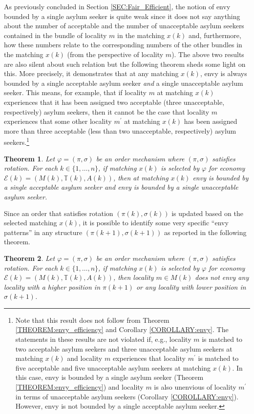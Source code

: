 \documentclass[12pt,fleqn]{article}
\newtheorem{theorem}{Theorem}
\begin{document}
\noindent As previously concluded in Section \ref{SEC:Fair_Efficient}, the notion of envy bounded by a single asylum seeker is quite weak since it does not say anything about the number of acceptable and the number of unacceptable asylum seekers contained in the bundle of locality $m$ in the matching $x(k)$ and, furthermore, how these numbers relate to the corresponding numbers of the other bundles in the matching $x(k)$ (from the perspective of locality $m$). The above two results are also silent about such relation but the following theorem sheds some light on this. More precisely, it demonstrates that at any matching $x(k)$, envy is always bounded by a single acceptable asylum seeker \emph{and} a single unacceptable asylum seeker. This means, for example, that if locality $m$ at matching $x(k)$ experiences that it has been assigned two acceptable (three unacceptable, respectively) asylum seekers, then it cannot be the case that locality $m$ experiences that some other locality $m^\prime$ at matching $x(k)$ has been assigned more than three acceptable (less than two unacceptable, respectively) asylum seekers.\footnote{Note that this result does not follow from Theorem \ref{THEOREM:envy_efficiency} and Corollary \ref{COROLLARY:envy}. The statements in these results are not violated if, e.g., locality $m$ is matched to two acceptable asylum seekers and three unacceptable asylum seekers at matching $x(k)$ and locality $m$ experiences that locality $m^\prime$ is matched to five acceptable and five unacceptable asylum seekers at matching $x(k)$. In this case, envy is bounded by a single asylum seeker (Theorem \ref{THEOREM:envy_efficiency}) and locality $m$ is also unenvious of locality $m^\prime$ in terms of unacceptable asylum seekers (Corollary \ref{COROLLARY:envy}). However, envy is not bounded by a single acceptable asylum seeker.}
\begin{theorem}\rm\label{TH:1_envy}
Let $\varphi=(\pi,\sigma)$ be an order mechanism where $(\pi,\sigma)$ satisfies rotation.
For each $k\in \{1,\ldots,n\}$, if matching $x(k)$ is selected by $\varphi$ for economy $\mathcal{E}(k)=(M(k),\mathbb{T}(k),A(k))$, then at matching $x(k)$ envy is bounded by a single acceptable asylum seeker \textit{and} envy is bounded by a single unacceptable asylum seeker.
\end{theorem}
\noindent Since an order that satisfies rotation $(\pi(k),\sigma(k))$ is updated based on the selected matching $x(k)$, it is possible to identify some very specific ``envy patterns'' in any structure $(\pi(k+1),\sigma(k+1))$ as reported in the following theorem.
\begin{theorem}\rm\label{TH:structures}
Let $\varphi=(\pi,\sigma)$ be an order mechanism where $(\pi,\sigma)$ satisfies rotation.
For each $k\in \{1,\ldots,n\}$, if matching $x(k)$ is selected by $\varphi$ for economy $\mathcal{E}(k)=(M(k),\mathbb{T}(k),A(k))$, then locality $m\in M(k)$ does not envy any
locality with a higher position in $\pi(k+1)$ or any locality with lower position in $\sigma(k+1)$.
\end{theorem}
\end{document}
